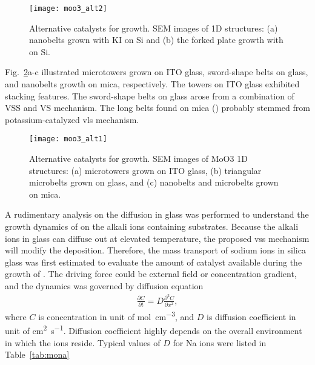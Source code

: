\begin{figure}[htb]
\centering
\texttt{[image: moo3\_alt2]}
\caption[Alternative catalysts for  growth]{Alternative catalysts for  growth. SEM images of  1D structures: (a) nanobelts grown with KI on Si and (b) the forked plate growth with  on Si.}
\label{fig:ch4al1}
\end{figure}

Fig.~\ref{fig:ch4al2}a-c illustrated microtowers grown on ITO glass, sword-shape belts on glass, and nanobelts growth on mica, respectively. The towers on ITO glass exhibited stacking features. The sword-shape belts on glass arose from a combination of VSS and VS mechanism. The long belts found on mica () probably stemmed from potassium-catalyzed \gls{vls} mechanism.\cite{Hu2011}

\begin{figure}[htb]
\centering
\texttt{[image: moo3\_alt1]}
\caption[Alternative catalysts for  growth cont]{Alternative catalysts for  growth. SEM images of MoO3 1D structures: (a) microtowers grown on ITO glass, (b) triangular microbelts grown on glass, and (c) nanobelts and microbelts grown on mica.}
\label{fig:ch4al2}
\end{figure}
A rudimentary analysis on the  diffusion in glass was performed to understand the growth dynamics of  on the alkali ions containing substrates. Because the alkali ions in glass can diffuse out at elevated temperature, the proposed \gls{vss} mechanism will modify the  deposition. Therefore, the mass transport of sodium ions in silica glass was first estimated to evaluate the amount of catalyst available during the growth of . The driving force could be external field or concentration gradient, and the dynamics was governed by diffusion equation
\begin{align}\label{eq:nadiff}
\frac{\partial C}{\partial t} = D \frac{\partial^2 C}{\partial x^2},
\end{align}
where $C$ is concentration in unit of \si{mol\per cm^3}, and $D$ is diffusion coefficient in unit of \si{cm^2\per\second}. Diffusion coefficient highly depends on the overall environment in which the ions reside. Typical values of $D$ for Na ions were listed in Table~\ref{tab:mona}

